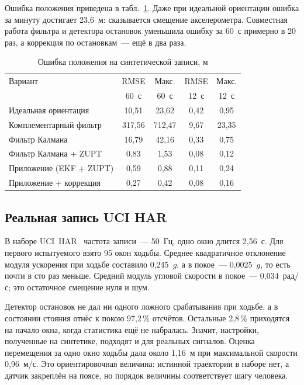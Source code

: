 \documentclass{misisarticle}
\begin{document}
Ошибка положения приведена в табл.~\ref{tab:pos}. Даже при идеальной ориентации ошибка за минуту достигает 23,6~м: сказывается смещение акселерометра. Совместная работа фильтра и детектора остановок уменьшила ошибку за 60~с примерно в 20 раз, а коррекция по остановкам~--- ещё в два раза.

\begin{table}[H]
  \caption{Ошибка положения на синтетической записи, м}
  \label{tab:pos}
  \centering
  \footnotesize
  \setlength{\tabcolsep}{3pt}
  \begin{tabular}{lcccc}
    \toprule
    Вариант & RMSE & Макс. & RMSE & Макс. \\
     & 60~с & 60~с & 12~с & 12~с \\
    \midrule
    Идеальная ориентация & 10,51 & 23,62 & 0,42 & 0,95 \\
    Комплементарный фильтр & 317,56 & 712,47 & 9,67 & 23,35 \\
    Фильтр Калмана & 16,79 & 42,16 & 0,33 & 0,75 \\
    Фильтр Калмана + ZUPT & 0,83 & 1,53 & 0,08 & 0,12 \\
    Приложение (EKF + ZUPT) & 0,59 & 0,88 & 0,11 & 0,24 \\
    Приложение + коррекция & 0,27 & 0,42 & 0,08 & 0,16 \\
    \bottomrule
  \end{tabular}
\end{table}

\subsection{Реальная запись UCI HAR}

В наборе UCI~HAR~\cite{uci} частота записи~--- 50~Гц, одно окно длится 2,56~с. Для первого испытуемого взято 95 окон ходьбы. Среднее квадратичное отклонение модуля ускорения при ходьбе составило 0,245~$g$, а в покое~--- 0,0025~$g$, то есть почти в сто раз меньше. Средний модуль угловой скорости в покое~--- 0,034~рад/с; это остаточное смещение нуля и шум.

Детектор остановок не дал ни одного ложного срабатывания при ходьбе, а в состоянии стояния отнёс к покою 97,2\,\% отсчётов. Остальные 2,8\,\% приходятся на начало окна, когда статистика ещё не набралась. Значит, настройки, полученные на синтетике, подходят и для реальных сигналов. Оценка перемещения за одно окно ходьбы дала около 1,16~м при максимальной скорости 0,96~м/с. Это ориентировочная величина: истинной траектории в наборе нет, а датчик закреплён на поясе, но порядок величины соответствует шагу человека.
\end{document}
